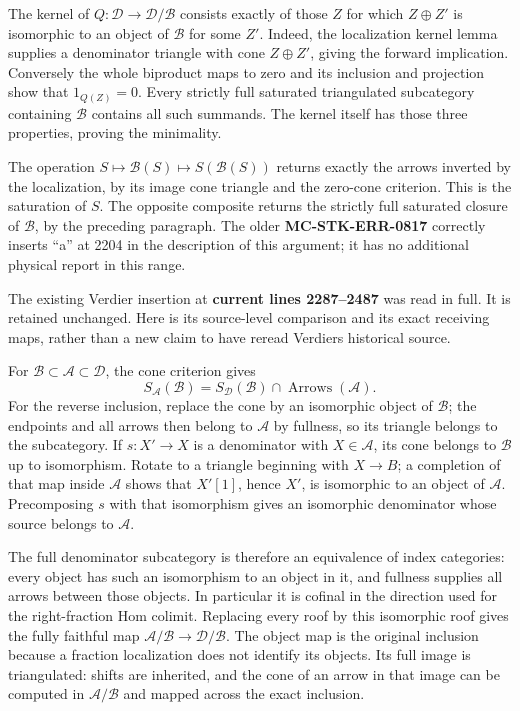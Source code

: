 The kernel of \(Q:\mathcal D\to\mathcal D/\mathcal B\) consists exactly of those \(Z\) for which \(Z\oplus Z'\) is isomorphic to an object of \(\mathcal B\) for some \(Z'\). Indeed,\allowbreak{} the localization kernel lemma supplies a denominator triangle with cone \(Z\oplus Z'\),\allowbreak{} giving the forward implication. Conversely the whole biproduct maps to zero and its inclusion and projection show that \(1_{Q(Z)}=0\). Every strictly full saturated triangulated subcategory containing \(\mathcal B\) contains all such summands. The kernel itself has those three properties,\allowbreak{} proving the minimality.

The operation \(S\mapsto\mathcal B(S)\mapsto S(\mathcal B(S))\) returns exactly the arrows inverted by the localization,\allowbreak{} by its image cone triangle and the zero-cone criterion. This is the saturation of \(S\). The opposite composite returns the strictly full saturated closure of \(\mathcal B\),\allowbreak{} by the preceding paragraph. The older \textbf{MC-STK-ERR-0817} correctly inserts ``a'' at 2204 in the description of this argument; it has no additional physical report in this range.

The existing Verdier insertion at \textbf{current lines 2287–\allowbreak{}2487} was read in full. It is retained unchanged. Here is its source-level comparison and its exact receiving maps,\allowbreak{} rather than a new claim to have reread Verdier\textquotesingle s historical source.

For \(\mathcal B\subset\mathcal A\subset\mathcal D\),\allowbreak{} the cone criterion gives \[
S_{\mathcal A}(\mathcal B)=S_{\mathcal D}(\mathcal B)
\cap\operatorname{Arrows}(\mathcal A).
\] For the reverse inclusion,\allowbreak{} replace the cone by an isomorphic object of \(\mathcal B\); the endpoints and all arrows then belong to \(\mathcal A\) by fullness,\allowbreak{} so its triangle belongs to the subcategory. If \(s:X'\to X\) is a denominator with \(X\in\mathcal A\),\allowbreak{} its cone belongs to \(\mathcal B\) up to isomorphism. Rotate to a triangle beginning with \(X\to B\); a completion of that map inside \(\mathcal A\) shows that \(X'[1]\),\allowbreak{} hence \(X'\),\allowbreak{} is isomorphic to an object of \(\mathcal A\). Precomposing \(s\) with that isomorphism gives an isomorphic denominator whose source belongs to \(\mathcal A\).

The full denominator subcategory is therefore an equivalence of index categories:\allowbreak{} every object has such an isomorphism to an object in it,\allowbreak{} and fullness supplies all arrows between those objects. In particular it is cofinal in the direction used for the right-fraction Hom colimit. Replacing every roof by this isomorphic roof gives the fully faithful map \(\mathcal A/\mathcal B\to\mathcal D/\mathcal B\). The object map is the original inclusion because a fraction localization does not identify its objects. Its full image is triangulated:\allowbreak{} shifts are inherited,\allowbreak{} and the cone of an arrow in that image can be computed in \(\mathcal A/\mathcal B\) and mapped across the exact inclusion.

